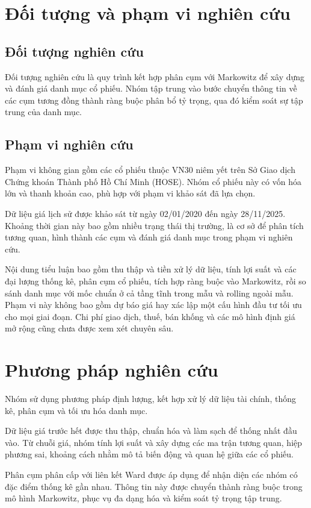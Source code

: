 \documentclass[12pt,a4paper,openany,oneside]{book}
\begin{document}
\section{Đối tượng và phạm vi nghiên cứu}\label{Toc227188414}
\subsection{Đối tượng nghiên cứu}
Đối tượng nghiên cứu là quy trình kết hợp phân cụm với Markowitz để xây dựng và đánh giá danh mục cổ phiếu. Nhóm tập trung vào bước chuyển thông tin về các cụm tương đồng thành ràng buộc phân bổ tỷ trọng, qua đó kiểm soát sự tập trung của danh mục.

\subsection{Phạm vi nghiên cứu}
Phạm vi không gian gồm các cổ phiếu thuộc VN30 niêm yết trên Sở Giao dịch Chứng khoán Thành phố Hồ Chí Minh (HOSE). Nhóm cổ phiếu này có vốn hóa lớn và thanh khoản cao, phù hợp với phạm vi khảo sát đã lựa chọn.

Dữ liệu giá lịch sử được khảo sát từ ngày 02/01/2020 đến ngày 28/11/2025. Khoảng thời gian này bao gồm nhiều trạng thái thị trường, là cơ sở để phân tích tương quan, hình thành các cụm và đánh giá danh mục trong phạm vi nghiên cứu.

Nội dung tiểu luận bao gồm thu thập và tiền xử lý dữ liệu, tính lợi suất và các đại lượng thống kê, phân cụm cổ phiếu, tích hợp ràng buộc vào Markowitz, rồi so sánh danh mục với mốc chuẩn ở cả tầng tĩnh trong mẫu và rolling ngoài mẫu. Phạm vi này không bao gồm dự báo giá hay xác lập một cấu hình đầu tư tối ưu cho mọi giai đoạn. Chi phí giao dịch, thuế, bán khống và các mô hình định giá mở rộng cũng chưa được xem xét chuyên sâu.

\section{Phương pháp nghiên cứu}\label{Toc227188415}
Nhóm sử dụng phương pháp định lượng, kết hợp xử lý dữ liệu tài chính, thống kê, phân cụm và tối ưu hóa danh mục.

Dữ liệu giá trước hết được thu thập, chuẩn hóa và làm sạch để thống nhất đầu vào. Từ chuỗi giá, nhóm tính lợi suất và xây dựng các ma trận tương quan, hiệp phương sai, khoảng cách nhằm mô tả biến động và quan hệ giữa các cổ phiếu.

Phân cụm phân cấp với liên kết Ward được áp dụng để nhận diện các nhóm có đặc điểm thống kê gần nhau. Thông tin này được chuyển thành ràng buộc trong mô hình Markowitz, phục vụ đa dạng hóa và kiểm soát tỷ trọng tập trung.
\end{document}
